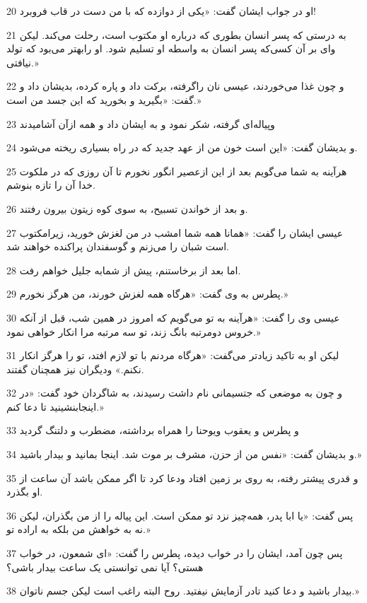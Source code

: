 \par 20 او در جواب ایشان گفت: «یکی از دوازده که با من دست در قاب فروبرد!
\par 21 به درستی که پسر انسان بطوری که درباره او مکتوب است، رحلت می‌کند. لیکن وای بر آن کسی‌که پسر انسان به واسطه او تسلیم شود. او رابهتر می‌بود که تولد نیافتی.»
\par 22 و چون غذا می‌خوردند، عیسی نان راگرفته، برکت داد و پاره کرده، بدیشان داد و گفت: «بگیرید و بخورید که این جسد من است.»
\par 23 وپیاله‌ای گرفته، شکر نمود و به ایشان داد و همه ازآن آشامیدند
\par 24 و بدیشان گفت: «این است خون من از عهد جدید که در راه بسیاری ریخته می‌شود.
\par 25 هرآینه به شما می‌گویم بعد از این ازعصیر انگور نخورم تا آن روزی که در ملکوت خدا آن را تازه بنوشم.
\par 26 و بعد از خواندن تسبیح، به سوی کوه زیتون بیرون رفتند.
\par 27 عیسی ایشان را گفت: «همانا همه شما امشب در من لغزش خورید، زیرامکتوب است شبان را می‌زنم و گوسفندان پراکنده خواهند شد.
\par 28 اما بعد از برخاستنم، پیش از شمابه جلیل خواهم رفت.
\par 29 پطرس به وی گفت: «هرگاه همه لغزش خورند، من هرگز نخورم.»
\par 30 عیسی وی را گفت: «هرآینه به تو می‌گویم که امروز در همین شب، قبل از آنکه خروس دومرتبه بانگ زند، تو سه مرتبه مرا انکار خواهی نمود.»
\par 31 لیکن او به تاکید زیادتر می‌گفت: «هرگاه مردنم با تو لازم افتد، تو را هرگز انکار نکنم.» ودیگران نیز همچنان گفتند.
\par 32 و چون به موضعی که جتسیمانی نام داشت رسیدند، به شاگردان خود گفت: «در اینجابنشینید تا دعا کنم.»
\par 33 و پطرس و یعقوب ویوحنا را همراه برداشته، مضطرب و دلتنگ گردید
\par 34 و بدیشان گفت: «نفس من از حزن، مشرف بر موت شد. اینجا بمانید و بیدار باشید.»
\par 35 و قدری پیشتر رفته، به روی بر زمین افتاد ودعا کرد تا اگر ممکن باشد آن ساعت از او بگذرد.
\par 36 پس گفت: «یا ابا پدر، همه‌چیز نزد تو ممکن است. این پیاله را از من بگذران، لیکن نه به خواهش من بلکه به اراده تو.»
\par 37 پس چون آمد، ایشان را در خواب دیده، پطرس را گفت: «ای شمعون، در خواب هستی؟ آیا نمی توانستی یک ساعت بیدار باشی؟
\par 38 بیدار باشید و دعا کنید تادر آزمایش نیفتید. روح البته راغب است لیکن جسم ناتوان.»
